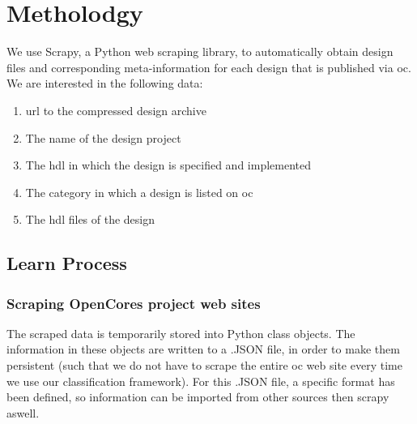 
\section{Metholodgy}

We use Scrapy, a Python web scraping library, to 
automatically obtain design files and corresponding meta-information for each 
design that is published via \gls{oc}. We are interested in the following data:

\begin{enumerate}

	\item{\Gls{url} to the compressed design archive}

	\item{The name of the design project}

	\item{The \gls{hdl} in which the design is specified and implemented}

	\item{The category in which a design is listed on \gls{oc}}
	
	\item{The \gls{hdl} files of the design}
	
\end{enumerate}

\subsection{Learn Process}

\subsubsection{Scraping OpenCores project web sites} 
The scraped data is temporarily stored into Python class objects. The information 
in these objects are written to a .JSON file, in order to make them persistent (such
that we do not have to scrape the entire \gls{oc} web site every time we use our 
classification framework). For this .JSON file, a specific format has been defined, 
so information can be imported from other sources then scrapy aswell. 

